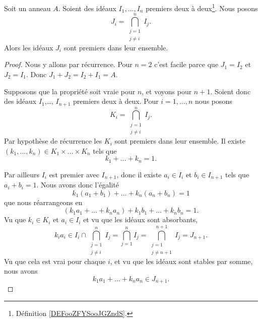 \begin{proposition}	\label{PROPooFGDKooPiDCAE}
	Soit un anneau \( A\). Soient des idéaux \( I_1,\ldots,I_n\) premiers deux à deux\footnote{Définition \ref{DEFooZFYSooJGZndS}.}. Nous posons
	\begin{equation}
		J_i=\bigcap_{\substack{ j=1 \\ j\neq i } }^nI_j.
	\end{equation}
	Alors les idéaux \( J_i\) sont premiers dans leur ensemble.
\end{proposition}

\begin{proof}
	Nous y allons par récurrence. Pour \( n=2\) c'est facile parce que \( J_1=I_2\) et \( J_2=I_1\). Donc \( J_1+J_2=I_2+I_1=A\).

	Supposons que la propriété soit vraie pour \( n\), et voyons pour \( n+1\). Soient donc des idéaux \( I_1\),\ldots, \( I_{n+1}\) premiers deux à deux.  Pour \( i=1,\ldots,n\) nous posons
	\begin{equation}
		K_i=\bigcap_{\substack{ j=1 \\ j\neq i } }^nI_j.
	\end{equation}
	Par hypothèse de récurrence les \( K_i\) sont premiers dans leur ensemble. Il existe \( (k_1,\ldots,k_n)\in K_1\times\ldots\times K_n\) tels que
	\begin{equation}
		k_1+\ldots+k_n=1.
	\end{equation}

	Par ailleurs \( I_i\) est premier avec \( I_{n+1}\), donc il existe \( a_i\in I_i\) et \( b_i\in I_{n+1}\) tels que \( a_i+b_i=1\). Nous avons donc l'égalité
	\begin{equation}
		k_1(a_1+b_1)+\ldots+k_n(a_n+b_n)=1
	\end{equation}
	que nous réarrangeons en
	\begin{equation}		\label{EQooDOFHooQUWtss}
		(k_1a_1+\ldots+k_na_n)+ k_1b_1+\ldots+k_nb_n=1.
	\end{equation}
	Vu que \( k_i\in K_i\) et \( a_i\in I_i\) et vu que les idéaux sont absorbants,
	\begin{equation}
		k_ia_i  \in I_i\cap\bigcap_{\substack{ j=1 \\ j\neq i }  }^nI_j=\bigcap_{j=1}^nI_j=\bigcap_{\substack{ j=1 \\ j\neq n+1 }  }^{n+1}I_j=J_{n+1}.
	\end{equation}
	Vu que cela est vrai pour chaque \( i\), et vu que les idéaux sont stables par somme, nous avons
	\begin{equation}
		k_1a_1+\ldots+k_na_n\in J_{n+1}.
	\end{equation}


\end{proof}
